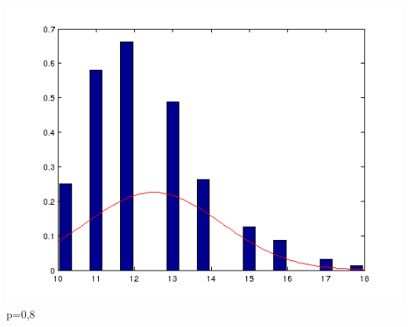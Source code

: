 \documentclass{article}
\begin{document}
\begin{center}
	\includegraphics[scale=0.5]{graph/n10p8.png} \\
	p=0,8
\end{center}
\end{document}
